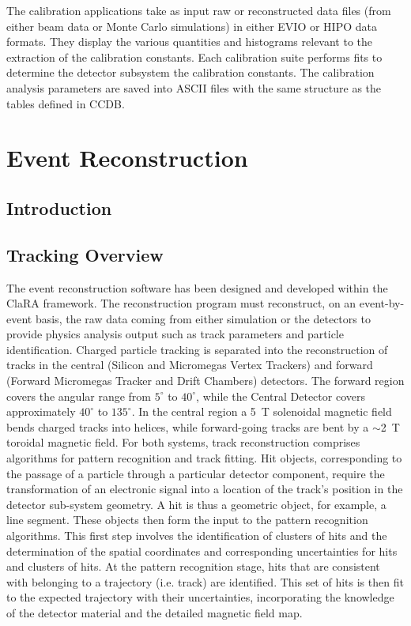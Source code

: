 \documentclass{elsart}
\begin{document}
The calibration applications take as input raw or reconstructed data files 
(from either beam data or Monte Carlo simulations) in
either EVIO or HIPO data formats.  They display the various quantities and histograms relevant to the 
extraction of the calibration constants.  Each calibration suite performs fits to determine the detector subsystem 
the calibration constants.  The calibration analysis parameters are saved into ASCII files 
with the same structure as the tables defined in CCDB.

\section{Event Reconstruction}

\subsection{Introduction}

\subsection{Tracking Overview}

The event reconstruction software has been designed and developed within the ClaRA framework. The
reconstruction program must reconstruct, on an event-by-event basis, the raw data coming from either
simulation or the detectors to provide physics analysis output such as track parameters and particle
identification. Charged particle tracking is separated into the reconstruction of tracks in the central
(Silicon and Micromegas Vertex Trackers) and forward (Forward Micromegas Tracker and Drift
Chambers) detectors. The forward region covers the angular range from $5^\circ$ to $40^\circ$, while
the Central Detector covers approximately $40^\circ$ to $135^\circ$. In the central region a 5~T
solenoidal magnetic field bends charged tracks into helices, while forward-going tracks are bent by a
$\sim$2~T toroidal magnetic field. For both systems, track reconstruction comprises algorithms for
pattern recognition and track fitting. Hit objects, corresponding to the passage of a particle through a
particular detector component, require the transformation of an electronic signal into a location of the
track's position in the detector sub-system geometry. A hit is thus a geometric object, for example, a
line segment. These objects then form the input to the pattern recognition algorithms. This first step
involves the identification of clusters of hits and the determination of the spatial coordinates and
corresponding uncertainties for hits and clusters of hits. At the pattern recognition stage, hits that are
consistent with belonging to a trajectory (i.e. track) are identified. This set of hits is then fit to the
expected trajectory with their uncertainties, incorporating the knowledge of the detector material and
the detailed magnetic field map.
\end{document}
